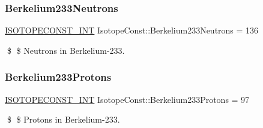 \subsubsection{\texorpdfstring{Berkelium233\+Neutrons}{Berkelium233Neutrons}}
{\footnotesize\ttfamily \mbox{\hyperlink{group___isotope_const-_macros_ga5f18360b3e99483a35c32d789e62621c}{I\+S\+O\+T\+O\+P\+E\+C\+O\+N\+S\+T\+\_\+\+I\+NT}} Isotope\+Const\+::\+Berkelium233\+Neutrons = 136}

\$ \$ Neutrons in Berkelium-\/233. \mbox{\label{group___isotope_const-_berkelium-_bk233_ga305e2ecd5cf50e3192bd662d53cd08e4}} 
\subsubsection{\texorpdfstring{Berkelium233\+Protons}{Berkelium233Protons}}
{\footnotesize\ttfamily \mbox{\hyperlink{group___isotope_const-_macros_ga5f18360b3e99483a35c32d789e62621c}{I\+S\+O\+T\+O\+P\+E\+C\+O\+N\+S\+T\+\_\+\+I\+NT}} Isotope\+Const\+::\+Berkelium233\+Protons = 97}

\$ \$ Protons in Berkelium-\/233. 